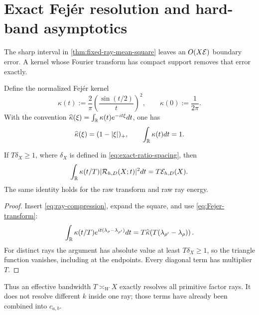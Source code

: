 \section{Exact Fej\'er resolution and hard-band asymptotics}
\label{sec:band-corollaries}

The sharp interval in \cref{thm:fixed-ray-mean-square} leaves an
$O(X\mathcal E)$ boundary error.  A kernel whose Fourier transform has compact
support removes that error exactly.

Define the normalized Fej\'er kernel
\begin{equation}
 \kappa(t):=\frac2\pi\left(\frac{\sin(t/2)}t\right)^2,
 \qquad \kappa(0):=\frac1{2\pi}.
 \label{eq:normalized-Fejer-kernel}
\end{equation}
With the convention
$\widehat\kappa(\xi)=\int_\mathbb R\kappa(t)e^{-it\xi}dt$, one has
\begin{equation}
 \widehat\kappa(\xi)=(1-|\xi|)_+,
 \qquad \int_\mathbb R\kappa(t)dt=1.
 \label{eq:Fejer-transform}
\end{equation}

\begin{theorem}
\label{thm:exact-Fejer-ray-Parseval}
If $T\delta_X\geq1$, where $\delta_X$ is defined in
\eqref{eq:exact-ratio-spacing}, then
\begin{equation}
 \int_\mathbb R\kappa(t/T)|\mathcal R_{h,D}(X;t)|^2dt
 =T\mathcal E_{h,D}(X).
 \label{eq:exact-Fejer-ray-Parseval}
\end{equation}
The same identity holds for the raw transform and raw ray energy.
\end{theorem}

\begin{proof}
Insert \eqref{eq:ray-compression}, expand the square, and use
\eqref{eq:Fejer-transform}:
\[
 \int_\mathbb R\kappa(t/T)e^{it(\lambda_\rho-\lambda_{\rho'})}dt
 =T\widehat\kappa\!\left(T(\lambda_{\rho'}-\lambda_\rho)\right).
\]
For distinct rays the argument has absolute value at least
$T\delta_X\geq1$, so the triangle function vanishes, including at the
endpoints.  Every diagonal term has multiplier $T$.
\end{proof}

Thus an effective bandwidth $T\asymp_W X$ exactly resolves all primitive
factor rays.  It does not resolve different $k$ inside one ray; those terms
have already been combined into $c_{a,b}$.

